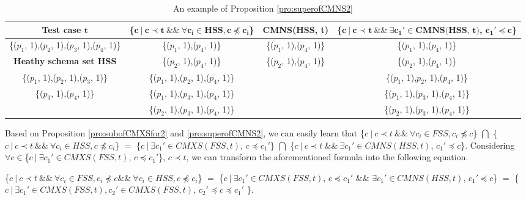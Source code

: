 {\begin{table}[ht]
  \centering
  \setlength{\tabcolsep}{1pt}
  \caption{An example of Proposition \ref{pro:superofCMNS2}}
  {\footnotesize
    \begin{tabular}{|c|c|c|c|}
    \hline
  \textbf{  Test case $\textbf{t}$} & \textbf{ \{$\textbf{c}\ |\ \textbf{c} \prec \textbf{t}\ \&\&\ \forall \textbf{c}_{\textbf{i}} \in \textbf{HSS}, \textbf{c} \npreceq \textbf{c}_{\textbf{i}} $\} }& \textbf{  CMNS(HSS, t)} & \textbf{\{$ \textbf{c}\ |\ \textbf{c} \prec \textbf{t} \ \&\& \ \exists \textbf{c}_{\textbf{1}}' \in \textbf{CMNS(HSS, t)}$, $\textbf{c}_{\textbf{1}}' \preceq \textbf{c}$\}}\\\hline
    \{($p_{1}$, 1),($p_{2}$, 1),($p_{3}$, 1),($p_{4}$, 1)\}  & \{($p_{1}$, 1),($p_{4}$, 1)\} & \{($p_{1}$, 1),($p_{4}$, 1)\} & \{($p_{1}$, 1),($p_{4}$, 1)\}\\ \cline{1-1}
      \textbf{Heathy schema set HSS}  & \{($p_{2}$, 1),($p_{4}$, 1)\} & \{($p_{2}$, 1),($p_{4}$, 1)\} & \{($p_{2}$, 1),($p_{4}$, 1)\} \\\cline{1-1}
     \{($p_{1}$, 1),($p_{2}$, 1),($p_{3}$, 1)\}         &\{($p_{1}$, 1),($p_{2}$, 1),($p_{4}$, 1)\}  &  &  \{($p_{1}$, 1),$p_{2}$, 1),($p_{4}$, 1)\}   \\
     \{($p_{3}$, 1),($p_{4}$, 1)\}         &\{($p_{1}$, 1),($p_{3}$, 1),($p_{4}$, 1)\}    &  &  \{($p_{1}$, 1),($p_{3}$, 1),($p_{4}$, 1)\}  \\
                         &\{($p_{2}$, 1),($p_{3}$, 1),($p_{4}$, 1)\}   &  & \{($p_{2}$, 1),($p_{3}$, 1),($p_{4}$, 1)\}   \\ \hline
    \end{tabular}}%
  \label{examleOfCMNSPro2}%
\end{table}%


Based on Proposition \ref{pro:subofCMXSfor2} and \ref{pro:superofCMNS2}, we can easily learn that \{$c\ |\ c \prec t\ \&\&\ \forall c_{i} \in FSS, c_{i} \npreceq c $\} $\bigcap$ \{$c\ |\ c \prec t\ \&\&\ \forall c_{i} \in HSS, c \npreceq c_{i} $\}  $=$  \{$ c\ |\ \exists c_{1}' \in CMXS(FSS, t)$, $c \preceq c_{1}'$\} $\bigcap$  \{$ c\ |\ c \prec t \ \&\& \ \exists c_{1}' \in CMNS(HSS, t)$, $c_{1}' \preceq c$\}. Considering $\forall c \in $\{$ c\ |\ \exists c_{1}' \in CMXS(FSS, t)$, $c \preceq c_{1}'$\}, $c \prec t$, we can transform the aforementioned formula into the following equation.

\{$c\ |\ c \prec t\ \&\&\ \forall c_{i} \in FSS, c _{i} \npreceq c \&\&\ \forall c_{i} \in HSS, c \npreceq c_{i}  $\} $=$  \{$ c\ |\ \exists c_{1}' \in CMXS(FSS, t)$, $c \preceq c_{1}'$ $\&\&$ $\exists c_{1}' \in CMNS(HSS, t)$, $c_{1}' \preceq c$\} $=$  \{$ c\ |\ \exists c_{1}' \in CMXS(FSS, t), c_{2}' \in CMXS(FSS, t)$, $c_{2}' \preceq c \preceq c_{1}'$ \}.

}
